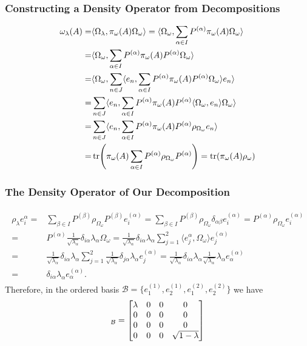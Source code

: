 \documentclass{beamer}
\begin{document}
\begin{frame}
	\frametitle{Constructing a Density Operator from Decompositions}
	\begin{align}
	\begin{split}
		\omega_\lambda(A)=&\langle\Omega_\lambda,\pi_\omega(A)\Omega_\omega\rangle=\langle\Omega_\omega,\sum_{\alpha\in I}P^{(\alpha)}\pi_\omega(A)\Omega_\omega\rangle\\
		=&\langle\Omega_\omega,\sum_{\alpha\in I}P^{(\alpha)}\pi_\omega(A)P^{(\alpha)}\Omega_\omega\rangle\\
		=&\langle\Omega_\omega,\sum_{n\in J}\langle e_n,\sum_{\alpha\in I}P^{(\alpha)}\pi_\omega(A)P^{(\alpha)}\Omega_\omega\rangle e_n\rangle\\
		=&\sum_{n\in J}\langle e_n,\sum_{\alpha\in I}P^{(\alpha)}\pi_\omega(A)P^{(\alpha)}\langle\Omega_\omega,e_n\rangle\Omega_\omega\rangle\\
		=&\sum_{n\in J}\langle e_n,\sum_{\alpha\in I}P^{(\alpha)}\pi_\omega(A)P^{(\alpha)}\rho_{\Omega_\omega}e_n\rangle\\
		=&\tr(\pi_\omega(A)\sum_{\alpha\in I}P^{(\alpha)}\rho_{\Omega_\omega}P^{(\alpha)})=\tr(\pi_\omega(A)\rho_\omega)
	\end{split}
	\end{align}
\end{frame}

\begin{frame}
	\frametitle{The Density Operator of Our Decomposition}
	\begin{align}
	\begin{split}
		\rho_\lambda e_i^{\alpha}=&\sum_{\beta\in I}P^{(\beta)}\rho_{\Omega_\omega}P^{(\beta)}e_i^{(\alpha)}=\sum_{\beta\in I}P^{(\beta)}\rho_{\Omega_\omega}\delta_{\alpha\beta}e_i^{(\alpha)}=P^{(\alpha)}\rho_{\Omega_\omega}e_i^{(\alpha)}\\
		=&P^{(\alpha)}\frac{1}{\sqrt{\lambda_\alpha}}\delta_{i\alpha}\lambda_\alpha\Omega_\omega=\frac{1}{\sqrt{\lambda_\alpha}}\delta_{i\alpha}\lambda_\alpha\sum_{j=1}^2\langle e_j^{\alpha},\Omega_\omega\rangle e_j^{(\alpha)}\\
		=&\frac{1}{\sqrt{\lambda_\alpha}}\delta_{i\alpha}\lambda_\alpha\sum_{j=1}^2\frac{1}{\sqrt{\lambda_\alpha}}\delta_{j\alpha}\lambda_\alpha e_j^{(\alpha)}=\frac{1}{\sqrt{\lambda_\alpha}}\delta_{i\alpha}\lambda_\alpha\frac{1}{\sqrt{\lambda_\alpha}}\lambda_\alpha e_\alpha^{(\alpha)}\\
		=&\delta_{i\alpha}\lambda_\alpha e_\alpha^{(\alpha)}.
	\end{split}
	\end{align}
	Therefore, in the ordered basis $\mathcal{B}=\{e_1^{(1)},e_2^{(1)},e_1^{(2)},e_2^{(2)}\}$ we have
	\begin{equation}
		[\rho_\lambda]_\mathcal{B}=\mqty[\lambda & 0 & 0 & 0\\ 0 & 0 & 0&0\\0&0&0&0\\0&0&0&\sqrt{1-\lambda}]
	\end{equation}
\end{frame}
\end{document}
